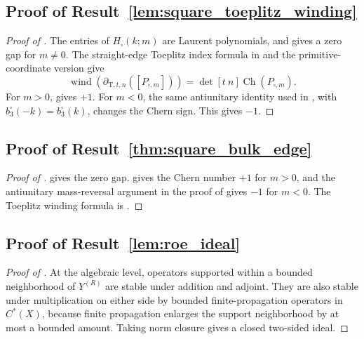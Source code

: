 \documentclass[11pt]{article}
\numberwithin{equation}{section}
\theoremstyle{definition}
\theoremstyle{remark}
\newcommand{\Ch}{\operatorname{Ch}}
\begin{document}
\subsection{Proof of Result~\ref{lem:square_toeplitz_winding}}\label{app:proof:lem:square_toeplitz_winding}
\begin{proof}[Proof of ]
The entries of \(H_{\square}(k;m)\) are Laurent polynomials, and  gives a
zero gap for \(m\ne0\). The straight-edge Toeplitz index formula in
 and the primitive-coordinate version
 give
\[
\operatorname{wind}\!\left(\partial_{\mathrm T,t,n}([P_{\square,m}])\right)
=
\det[t\ n]\Ch(P_{\square,m}).
\]
For \(m>0\),  gives \(+1\). For \(m<0\), the same antiunitary
identity used in , with \(b_3^{\square}(-k)=b_3^{\square}(k)\), changes
the Chern sign. This gives \(-1\).
\end{proof}

\subsection{Proof of Result~\ref{thm:square_bulk_edge}}\label{app:proof:thm:square_bulk_edge}
\begin{proof}[Proof of ]
 gives the zero gap.  gives the Chern
number \(+1\) for \(m>0\), and the antiunitary mass-reversal argument in the proof of
 gives \(-1\) for \(m<0\). The Toeplitz winding formula is
.
\end{proof}

\subsection{Proof of Result~\ref{lem:roe_ideal}}\label{app:proof:lem:roe_ideal}
\begin{proof}[Proof of ]
At the algebraic level, operators supported within a bounded neighborhood of $Y^{(R)}$ are stable
under addition and adjoint. They are also stable under multiplication on either side by bounded
finite-propagation operators in $C^*(X)$, because finite propagation enlarges the support
neighborhood by at most a bounded amount. Taking norm closure gives a closed two-sided ideal.
\end{proof}
\end{document}

